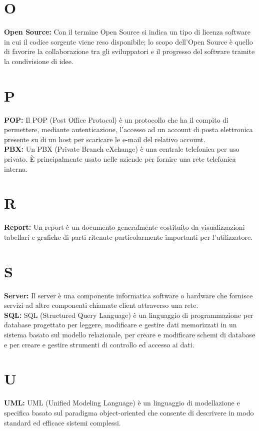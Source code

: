 {\section*{O}
\hypertarget{opensource}{}
\textbf{Open Source:}
Con il termine Open Source si indica un tipo di licenza software in cui il codice sorgente viene reso disponibile; lo scopo dell'Open Source \`e quello di favorire la collaborazione tra gli sviluppatori e il progresso del software tramite la condivisione di idee.\\

\section*{P}
\hypertarget{pop}{}
\textbf{POP:}
Il POP (Post Office Protocol) \`e un protocollo che ha il compito di permettere, mediante autenticazione, l'accesso ad un account di posta elettronica presente su di un host per scaricare le e-mail del relativo account.\\

\hypertarget{pbx}{}
\noindent
\textbf{PBX:}
Un PBX (Private Branch eXchange) \`e una centrale telefonica per uso privato. \`E principalmente usato nelle aziende per fornire una rete telefonica interna.

\section*{R}
\hypertarget{report}{}
\textbf{Report:}
Un report \`e un documento generalmente costituito da visualizzazioni tabellari e grafiche di parti ritenute particolarmente importanti per l'utilizzatore.

\section*{S}
\hypertarget{server}{}
\textbf{Server:}
Il server \`e una componente informatica software o hardware che fornisce servizi ad altre componenti chiamate client attraverso una rete. \\


\hypertarget{sql}{}
\noindent
\textbf{SQL:}
SQL (Structured Query Language) \`e un linguaggio di programmazione per database progettato per leggere, modificare e gestire dati memorizzati in un sistema basato sul modello relazionale, per creare e modificare schemi di database e per creare e gestire strumenti di controllo ed accesso ai dati.\\

\section*{U}
\hypertarget{uml}{}
\textbf{UML:}
UML (Unified Modeling Language) \`e un  linguaggio di modellazione e specifica basato sul paradigma object-oriented che consente di descrivere in modo standard ed efficace sistemi complessi.\\

}
